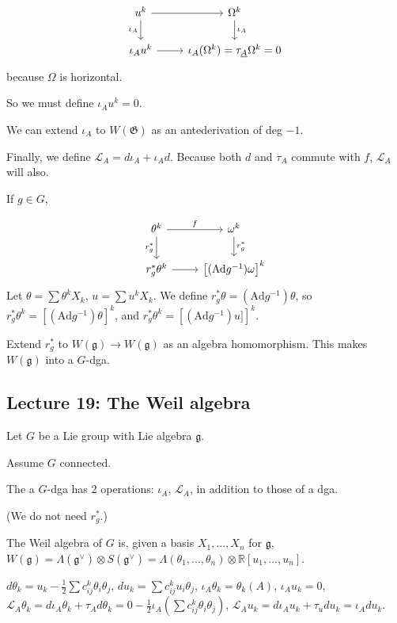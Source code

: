\documentclass{article}
\theoremstyle{mystyle}
\theoremstyle{remark}
\numberwithin{equation}{section}
\begin{document}
$$
\begin{tikzcd} u^k\ar[r]\ar[d,"\iota_A"'] & \Omega^k  \ar[d,"\iota_A"]\\ \iota_Au^k \ar[r]& \iota_A(\Omega^k) = \tau_{\underline{A}} \Omega^k = 0
\end{tikzcd}
$$
because $\Omega$ is horizontal.

So we must define $\iota_Au^k =0$.

We can extend $\iota_A$ to $W(\mathfrak{G})$ as an antederivation of deg $-1$.

Finally, we define $\mathcal{L}_A = d\iota_A + \iota_A d$. Because both $d$ and $\tau_A$ commute with $f$, $\mathcal{L}_A$ will also. 

If $g \in G$,

$$
\begin{tikzcd} \theta^k \ar[r,"f"]\ar[d,"r_g^*"'] & \omega^k  \ar[d,"r_g^*"]\\ r_g^*\theta^k \ar[r] & \left[(\mathrm{Ad}g^{-1})\omega\right]^k
\end{tikzcd}
$$
Let $\theta = \sum \theta^kX_k$, $u = \sum u^k X_k$. We define $r_g^*\theta = (\mathrm{Ad}g^{-1})\theta$, so $r_g^*\theta^k = \left[ (\mathrm{Ad} g^{-1})\theta\right]^k$, and $r_g^*\theta^k = \left[(\mathrm{Ad}g^{-1})u]\right]^k$.


Extend $r_g^*$ to $W(\mathfrak{g})\rightarrow W(\mathfrak{g})$ as an algebra homomorphism. This makes $W(\mathfrak{g})$ into a $G$-\textsf{dga}.



\subsection{Lecture 19: The Weil algebra}

Let $G$ be a Lie group with Lie algebra $\mathfrak{g}$.

Assume $G$ connected.

The a $G$-\textsf{dga} has 2 operations: $\iota_A$, $\mathcal{L}_A$, in addition to those of a \textsf{dga}.

(We do not need $r^*_g$.)

The Weil algebra of $G$ is, given a basis $X_1,...,X_n$ for $\mathfrak{g}$, $W(\mathfrak{g}) = \Lambda(\mathfrak{g}^\vee)\otimes S(\mathfrak{g}^\vee) = \Lambda(\theta_1,...,\theta_n)\otimes \mathbb{R}[u_1,...,u_n]$.

$d\theta_k = u_k - \frac{1}{2} \sum c^k_{ij}\theta_i \theta_j$, $d u_k = \sum c^k_{ij}u_i\theta_j$, $\iota_A \theta_k = \theta_k(A)$, $\iota_A u_k=0$, 
$\mathcal{L}_A \theta_k = d\iota_A \theta_k + \tau_A d\theta_k = 0 - \frac{1}{2} \iota_A (\sum c^k_{ij}\theta_i\theta_j)$, $\mathcal{L}_A u_k = d\iota_A u_k + \tau_u du_k = \iota_A du_k$. 
\end{document}

